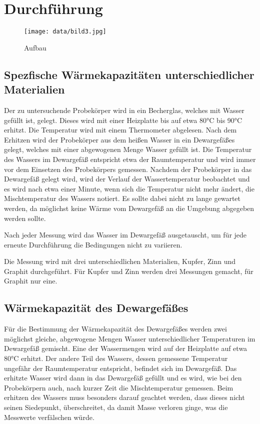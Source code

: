 \section{Durchführung}
\label{sec:Durchführung}

\begin{figure}
    \centering
    \caption{Aufbau}
    \texttt{[image: data/bild3.jpg]}
\end{figure}

\subsection{Spezfische Wärmekapazitäten unterschiedlicher Materialien}

Der zu untersuchende Probekörper wird in ein Becherglas, welches mit Wasser gefüllt ist, gelegt. Dieses wird mit einer Heizplatte
bis auf etwa 80\si{\celsius} bis 90\si{\celsius} erhitzt. Die Temperatur wird mit einem Thermometer abgelesen. Nach dem Erhitzen wird der 
Probekörper aus dem heißen Wasser in ein Dewargefäßes gelegt, welches mit einer abgewogenen Menge Wasser gefüllt ist. Die Temperatur
des Wassers im Dewargefäß entspricht etwa der Raumtemperatur und wird immer vor dem Einsetzen des Probekörpers gemessen. Nachdem der
Probekörper in das Dewargefäß gelegt wird, wird der Verlauf der Wassertemperatur beobachtet und es wird nach etwa einer Minute,
wenn sich die Temperatur nicht mehr ändert, die
Mischtemperatur des Wassers notiert. Es sollte dabei nicht zu lange gewartet werden, da möglichst keine Wärme vom Dewargefäß an 
die Umgebung abgegeben werden sollte. 

Nach jeder Messung wird das Wasser im Dewargefäß ausgetauscht, um für jede erneute Durchführung die Bedingungen nicht zu variieren.

Die Messung wird mit drei unterschiedlichen Materialien, Kupfer, Zinn und Graphit durchgeführt. Für Kupfer und Zinn werden drei
Messungen gemacht, für Graphit nur eine.

\subsection{Wärmekapazität des Dewargefäßes}

Für die Bestimmung der Wärmekapazität des Dewargefäßes werden zwei möglichst gleiche, abgewogene Mengen Wasser unterschiedlicher
Temperaturen im Dewargefäß gemischt. Eine der Wassermengen wird auf der Heizplatte auf etwa 80\si{\celsius} erhitzt. Der andere
Teil des Wassers, dessen gemessene Temperatur ungefähr der Raumtemperatur entspricht, befindet sich im Dewargefäß. 
Das erhitzte Wasser wird dann in das Dewargefäß gefüllt und es wird, wie bei den Probekörpern auch, nach kurzer Zeit die 
Mischtemperatur gemessen. Beim erhitzen des Wassers muss besonders darauf geachtet werden, dass dieses nicht seinen Siedepunkt,
überschreitet, da damit Masse verloren ginge, was die Messwerte verfälschen würde.

